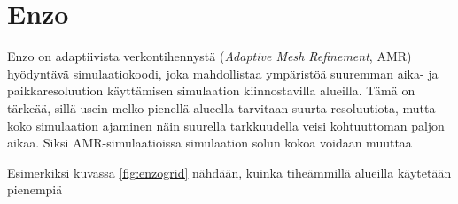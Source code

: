 \documentclass[12pt,a4paper]{article}
\begin{document}



\section{Enzo}
Enzo on adaptiivista verkontihennystä (\textit{Adaptive Mesh Refinement}, AMR) hyödyntävä simulaatiokoodi, %
joka mahdollistaa ympäristöä suuremman aika- ja paikkaresoluution käyttämisen simulaation kiinnostavilla alueilla. Tämä on tärkeää, sillä usein melko pienellä alueella tarvitaan suurta resoluutiota, mutta koko simulaation ajaminen näin suurella tarkkuudella veisi kohtuuttoman paljon aikaa. Siksi AMR-simulaatioissa simulaation solun kokoa voidaan muuttaa  %

Esimerkiksi kuvassa \ref{fig:enzogrid} nähdään, kuinka tiheämmillä alueilla käytetään pienempiä 
\end{document}
